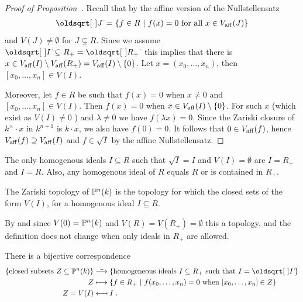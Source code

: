 \documentclass[a4paper,parskip=half,numbers=enddot, DIV=12]{scrreprt}
\begin{document}
\begin{proof}[Proof of Proposition~]
    Recall that by the affine version of the Nullstellensatz
    \begin{align*}
        \sqrt{J} = \left\{f\in R\st f(x) = 0 \text{ for all } x\in V_\aff(J)\right\}
    \end{align*}
    and $V(J)\neq \emptyset$ for $J\subsetneq R$. Since we assume $\sqrt{I}\subsetneq R_+ = \sqrt{R\smash{_+}}$ this implies that there is $x\in V_{\mathrm{aff}}(I)\setminus V_{\mathrm{aff}}(R_+) = V_{\mathrm{aff}}(I)\setminus\{0\}$. Let $x=(x_0,\ldots, x_n)$, then $[x_0,\ldots,x_n]\in V(I)$. 
    
    Moreover, let $f\in R$ be such that $f(x) = 0$ when $x\neq 0$ and $[x_0,\ldots, x_n]\in V(I)$. Then $f(x)=0$ when $x\in V_{\mathrm{aff}}(I)\setminus\{0\}$. For such $x$ (which exist as $V(I)\neq 0$ ) and $\lambda\neq 0$ we have $f(\lambda x) = 0$. Since the Zariski closure of $k^\times \cdot x$ in $k^{n+1}$ is $k\cdot x$, we also have $f(0)=0$. It follows that $0\in V_{\mathrm{aff}}(f)$, hence $V_{\mathrm{aff}}(f)\supseteq V_{\mathrm{aff}}(I)$ and $f\in \sqrt{I}$ by the affine Nullstellensatz.
\end{proof}
\begin{rem*}
    The only homogenous ideals $I\subseteq R$ such that $\sqrt{I}=I$ and $V(I)=\emptyset$ are $I=R_+$ and $I=R$. Also, any homogenous ideal of $R$ equals $R$ or is contained in $R_+$.
\end{rem*}
\begin{defi}[Topology on $\IP^n(k)$]
    The Zariski topology of $\IP^n(k)$ is the topology for which the closed sets of the form $V(I)$, for a homogenous ideal $I\subseteq R$.
\end{defi}
\begin{rem*}
    By  and since $V(0)= \mathbb{P}^n(k)$ and $V(R) = V(R_+) =\emptyset$ this a topology, and the definition does not change when only ideals in $R_+$ are allowed.
\end{rem*}
\begin{prop}
There is a bijective correspondence
\begin{align*}
\left\{\text{closed subsets }Z\subseteq\IP^n(k)\right\}&\isomorphism\left\{\text{homogeneous ideals }I\subseteq R_+\text{ such that }I=\sqrt{I}\right\}\\
Z &\longmapsto \left\{f\in R_+ \st f(x_0,\ldots,x_n) = 0\text{ when } [x_0,\ldots,x_n]\in Z\right\}\\
Z=V(I) &\longmapsfrom I\;.
\end{align*}
\end{prop}
\end{document}
